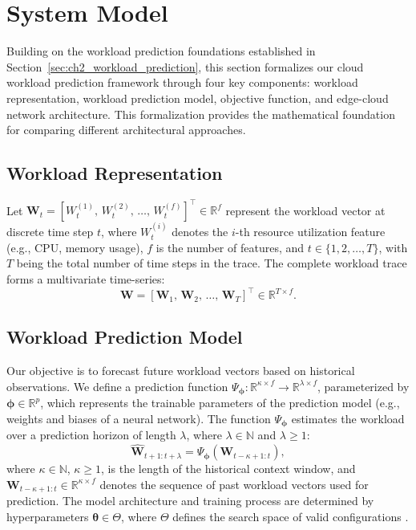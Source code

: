 \section{System Model}
\label{sec:ch3_system_model}

Building on the workload prediction foundations established in Section~\ref{sec:ch2_workload_prediction}, this section formalizes our cloud workload prediction framework through four key components: workload representation, workload prediction model, objective function, and edge-cloud network architecture. This formalization provides the mathematical foundation for comparing different architectural approaches.

\subsection{Workload Representation}

Let $\mathbf{W}_t = [W_t^{(1)},\, W_t^{(2)},\, \ldots,\, W_t^{(f)}]^\top \in \mathbb{R}^f$ represent the workload vector \cite{zhou2021informer} at discrete time step $t$, where $W_t^{(i)}$ denotes the $i$-th resource utilization feature (e.g., \ac{CPU}, memory usage), $f$ is the number of features, and $t \in \{1, 2, \ldots, T\}$, with $T$ being the total number of time steps in the trace. The complete workload trace forms a multivariate time-series:
\begin{equation}
\mathbf{W} = [\mathbf{W}_1,\, \mathbf{W}_2,\, \ldots,\, \mathbf{W}_T]^\top \in \mathbb{R}^{T \times f}.
\end{equation}

\subsection{Workload Prediction Model}

Our objective is to forecast future workload vectors based on historical observations. We define a prediction function $\Psi_{\boldsymbol{\phi}}: \mathbb{R}^{\kappa \times f} \rightarrow \mathbb{R}^{\lambda \times f}$, parameterized by $\boldsymbol{\phi} \in \mathbb{R}^p$, which represents the trainable parameters of the prediction model (e.g., weights and biases of a neural network). The function $\Psi_{\boldsymbol{\phi}}$ estimates the workload over a prediction horizon of length $\lambda$, where $\lambda \in \mathbb{N}$ and $\lambda \geq 1$:
\begin{equation}
\label{eq:forecast_workload}
\hat{\mathbf{W}}_{t+1:t+\lambda} = \Psi_{\boldsymbol{\phi}}\left( \mathbf{W}_{t-\kappa+1:t} \right),
\end{equation}
where $\kappa \in \mathbb{N}$, $\kappa \geq 1$, is the length of the historical context window, and $\mathbf{W}_{t-\kappa+1:t} \in \mathbb{R}^{\kappa \times f}$ denotes the sequence of past workload vectors used for prediction. The model architecture and training process are determined by hyperparameters $\boldsymbol{\theta} \in \Theta$, where $\Theta$ defines the search space of valid configurations \cite{hyperparamsdatasets}.

